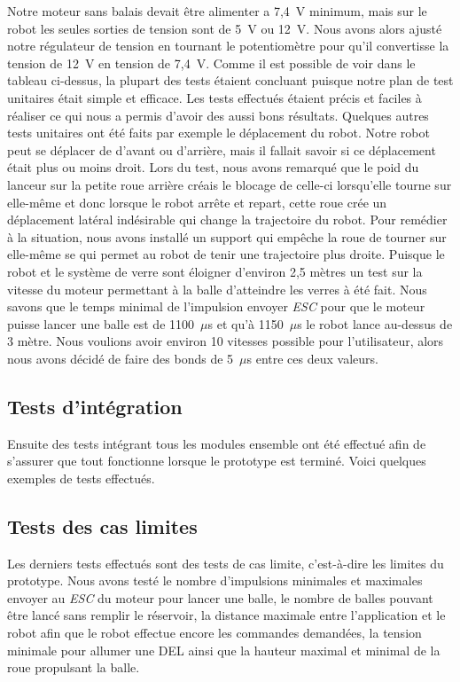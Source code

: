 Notre moteur sans balais devait être alimenter a 7,4~V minimum, mais sur le robot les seules sorties de tension sont de 5~V ou 12~V.
Nous avons alors ajusté notre régulateur de tension en tournant le potentiomètre pour qu’il convertisse la tension de 12~V en tension de 7,4~V.
Comme il est possible de voir dans le tableau ci-dessus, la plupart des tests étaient concluant puisque notre plan de test unitaires était simple et efficace.
Les tests effectués étaient précis et faciles à réaliser ce qui nous a permis d’avoir des aussi bons résultats.
Quelques autres tests unitaires ont été faits par exemple le déplacement du robot.
Notre robot peut se déplacer de d’avant ou d’arrière, mais il fallait savoir si ce déplacement était plus ou moins droit.
Lors du test, nous avons remarqué que le poid du lanceur sur la petite roue arrière créais le blocage de celle-ci lorsqu’elle tourne sur elle-même et donc lorsque le robot arrête et repart, cette roue crée un déplacement latéral indésirable qui change la trajectoire du robot.
Pour remédier à la situation, nous avons installé un support qui empêche la roue de tourner sur elle-même se qui permet au robot de tenir une trajectoire plus droite.
Puisque le robot et le système de verre sont éloigner d’environ 2,5 mètres un test sur la vitesse du moteur permettant à la balle d’atteindre les verres à été fait.
Nous savons que le temps minimal de l’impulsion envoyer \emph{ESC} pour que le moteur puisse lancer une balle est de 1100~$\mu$s et qu’à 1150~$\mu$s le robot lance au-dessus de 3 mètre.
Nous voulions avoir environ 10 vitesses possible pour l’utilisateur, alors nous avons décidé de faire des bonds de 5~$\mu$s entre ces deux valeurs.

\subsection{Tests d'intégration}

Ensuite des tests intégrant tous les modules ensemble ont été effectué afin de s’assurer que tout fonctionne lorsque le prototype est terminé.
Voici quelques exemples de tests effectués.


\subsection{Tests des cas limites}

Les derniers tests effectués sont des tests de cas limite, c’est-à-dire les limites du prototype.
Nous avons testé le nombre d’impulsions minimales et maximales envoyer au \emph{ESC} du moteur pour lancer une balle, le nombre de balles pouvant être lancé sans remplir le réservoir, la distance maximale entre l’application et le robot afin que le robot effectue encore les commandes demandées, la tension minimale pour allumer une DEL ainsi que la hauteur maximal et minimal de la roue propulsant la balle.

